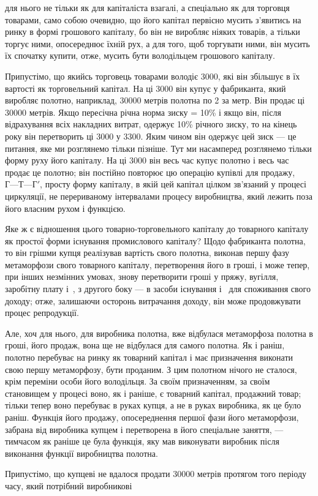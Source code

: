 \parcont{}  %
для нього не тільки як для капіталіста взагалі, а спеціально як
для торговця товарами, само собою очевидно, що його капітал
первісно мусить з’явитись на ринку в формі грошового капіталу,
бо він не виробляє ніяких товарів, а тільки торгує ними, опосереднює їхній рух, а для того, щоб
торгувати ними, він мусить
їх спочатку купити, отже, мусить бути володільцем грошового
капіталу.

Припустімо, що якийсь торговець товарами володіє 3000, які він збільшує в їх
вартості як торговельний
капітал. На ці 3000 він купує у фабриканта,
який виробляє полотно, наприклад, \num{30000} метрів полотна по
2 за метр. Він продає ці \num{30000} метрів. Якщо пересічна
річна норма зиску = 10\% і якщо він, після відрахування всіх
накладних витрат, одержує 10\% річного зиску, то на кінець року
він перетворить ці 3000 у 3300. Яким чином він одержує цей зиск
— це питання, яке ми
розглянемо тільки пізніше. Тут ми насамперед розглянемо тільки
форму руху його капіталу. На ці 3000 він
весь час купує полотно і весь час продає це полотно; він постійно повторює цю операцію купівлі для
продажу, $Г — Т — Г'$,
просту форму капіталу, в якій цей капітал цілком зв’язаний у процесі циркуляції, не перериваному
інтервалами процесу виробництва, який лежить поза його власним рухом і функцією.

Яке ж є відношення цього товарно-торговельного капіталу
до товарного капіталу як простої форми існування промислового
капіталу? Щодо фабриканта полотна, то він грішми купця реалізував вартість свого полотна, виконав
першу фазу метаморфози свого товарного капіталу, перетворення його в гроші, і може
тепер, при інших незмінних умовах, знову перетворити гроші
у пряжу, вугілля, заробітну плату і~, з другого боку — в засоби існування і~ для
споживання свого доходу; отже, залишаючи осторонь витрачання доходу, він може продовжувати процес
репродукції.

Але, хоч для нього, для виробника полотна, вже відбулася
метаморфоза полотна в гроші, його продаж, вона ще не відбулася для самого полотна. Як і раніш,
полотно перебуває на ринку
як товарний капітал і має призначення виконати свою першу
метаморфозу, бути проданим. З цим полотном нічого не сталося,
крім переміни особи його володільця. За своїм призначенням, за
своїм становищем у процесі воно, як і раніше, є товарний капітал, продажний товар; тільки тепер воно
перебуває в руках
купця, а не в руках виробника, як це було раніш. Функція його
продажу, опосереднення першої фази його метаморфози, забрана
від виробника купцем і перетворена в його спеціальне заняття, — тимчасом як раніше це була функція,
яку мав виконувати виробник після виконання функції виробництва полотна.

Припустімо, що купцеві не вдалося продати \num{30000} метрів
протягом того періоду часу, який потрібний виробникові
\parbreak{}  %
